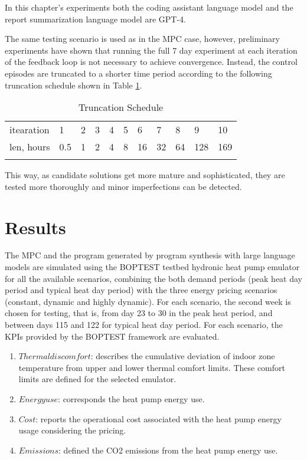 In this chapter’s experiments both the coding assistant language model and the report summarization language model are GPT-4.

The same testing scenario is used as in the MPC case, however, preliminary experiments have shown that running the full 7 day experiment at each iteration of the feedback loop is not necessary to achieve convergence. Instead, the control episodes are truncated to a shorter time period according to the following truncation schedule shown in Table \ref{tab:1}.

\begin{table}
\caption{Truncation Schedule}
\label{tab:1}       %
\begin{tabular}{lllllllllll}
\hline\noalign{\smallskip}
itearation & 1 & 2 & 3 & 4 & 5 & 6 & 7 & 8 & 9 & 10 \\
\noalign{\smallskip}\hline\noalign{\smallskip}
len, hours & 0.5 & 1 & 2 & 4 & 8 & 16 & 32 & 64 & 128 & 169 \\
\noalign{\smallskip}\hline
\end{tabular}
\end{table}

This way, as candidate solutions get more mature and sophisticated, they are tested more thoroughly and minor imperfections can be detected.

\newpage
\section{Results}
\label{sec:results}
The MPC and the program generated by program synthesis with large language models are simulated using the BOPTEST testbed hydronic heat pump emulator for all the available scenarios, combining the both demand periods (peak heat day period and typical heat day period) with the three energy pricing scenarios (constant, dynamic and highly dynamic). For each scenario, the second week is chosen for testing, that is, from day 23 to 30 in the peak heat period, and between days 115 and 122 for typical heat day period.
For each scenario, the KPIs provided by the BOPTEST framework are evaluated.
 \begin{enumerate}
     \item $Thermal discomfort$: describes the cumulative deviation of indoor zone temperature from upper and lower thermal comfort limits. These comfort limits are defined for the selected emulator.
     \item $Energy use$: corresponds the heat pump energy use.
     \item $Cost$: reports the operational cost associated with the heat pump energy usage considering the pricing.
     \item $Emissions$: defined the CO2 emissions from the heat pump energy use.
 \end{enumerate}
 
